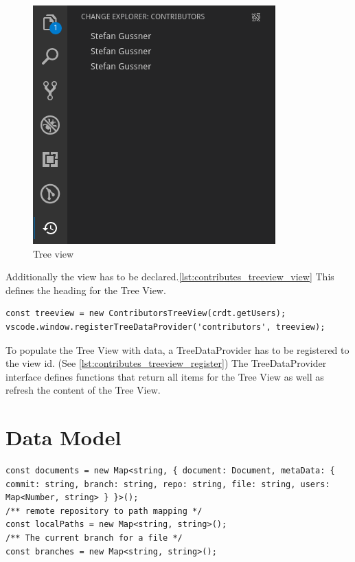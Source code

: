 \begin{figure}[hb]
    \centering
    \includegraphics{figures/screenshots/treeview.png}
    \caption{Tree view}
    \label{fig:treeview}
\end{figure}

Additionally the view has to be declared.\autoref{lst:contributes_treeview_view} This defines the heading for the Tree View.

\begin{lstlisting}[label={lst:contributes_treeview_register}, caption=Define Tree View Data Provider]
const treeview = new ContributorsTreeView(crdt.getUsers);
vscode.window.registerTreeDataProvider('contributors', treeview);
\end{lstlisting}

To populate the Tree View with data, a TreeDataProvider has to be registered to the view id. (See \autoref{lst:contributes_treeview_register})
The TreeDataProvider interface defines functions that return all items for the Tree View as well as refresh the content of the Tree View.

\section{Data Model}

\begin{lstlisting}[label={lst:datamodel_declarations}, caption=Data Model Declarations]
const documents = new Map<string, { document: Document, metaData: { commit: string, branch: string, repo: string, file: string, users: Map<Number, string> } }>();
/** remote repository to path mapping */
const localPaths = new Map<string, string>();
/** The current branch for a file */
const branches = new Map<string, string>();
\end{lstlisting}

